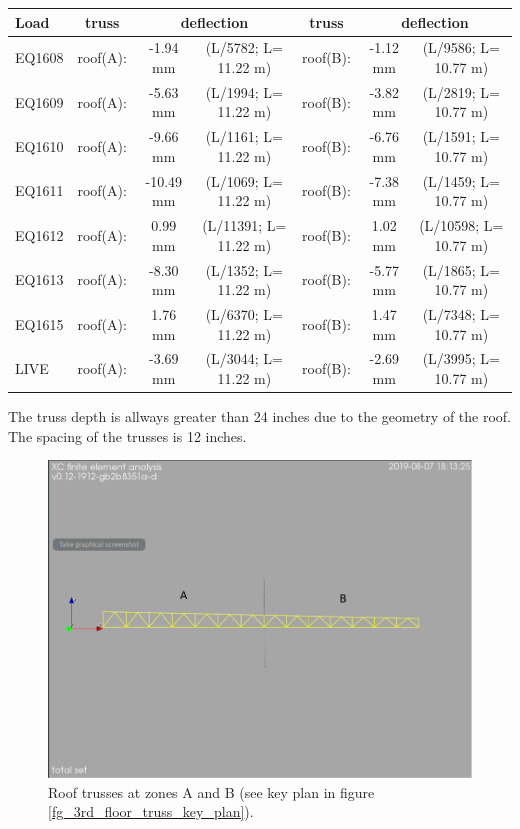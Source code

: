 \begin{center}
  \begin{scriptsize}
  \begin{tabular}{|l|c|c|c|c|c|c|}
    \hline
    \textbf{Load} & \textbf{truss} & \multicolumn{2}{c|}{\textbf{deflection}} & \textbf{truss} & \multicolumn{2}{c|}{\textbf{deflection}} \\
    \hline
EQ1608 & roof(A): & -1.94 mm & (L/5782; L= 11.22 m) & roof(B): &-1.12 mm & (L/9586; L= 10.77 m) \\
EQ1609 & roof(A): & -5.63 mm & (L/1994; L= 11.22 m) & roof(B): & -3.82 mm & (L/2819; L= 10.77 m) \\
EQ1610 & roof(A): & -9.66 mm & (L/1161; L= 11.22 m) & roof(B): & -6.76 mm & (L/1591; L= 10.77 m) \\
EQ1611 & roof(A): & -10.49 mm & (L/1069; L= 11.22 m) & roof(B): & -7.38 mm & (L/1459; L= 10.77 m) \\
EQ1612 & roof(A): & 0.99 mm & (L/11391; L= 11.22 m) & roof(B): & 1.02 mm & (L/10598; L= 10.77 m) \\
EQ1613 & roof(A): & -8.30 mm & (L/1352; L= 11.22 m) & roof(B): & -5.77 mm & (L/1865; L= 10.77 m) \\
EQ1615 & roof(A): & 1.76 mm & (L/6370; L= 11.22 m) & roof(B): & 1.47 mm & (L/7348; L= 10.77 m) \\
LIVE & roof(A): & -3.69 mm & (L/3044; L= 11.22 m) & roof(B): & -2.69 mm & (L/3995; L= 10.77 m) \\
\hline
  \end{tabular}
  \end{scriptsize}
\end{center}

\noindent The truss depth is allways greater than 24 inches due to the geometry of the roof. The spacing of the trusses is 12 inches.

\begin{figure}
  \begin{center}
  \includegraphics[width=120mm]{figures/roof_truss_AB}
  \end{center}
  \caption{Roof trusses at zones A and B (see key plan in figure \ref{fg_3rd_floor_truss_key_plan}).}\label{fg_roof_truss_AB}
\end{figure}

